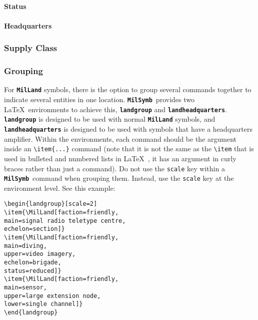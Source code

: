 \documentclass[a4paper, titlepage]{article}
\newcommand\MilSymb{\textbf{\texttt{MilSymb}}}
\newenvironment{writett}{\ttfamily}{\par}
\begin{document}
\paragraph{Status}

\paragraph{Headquarters}

\subsubsection{Supply Class}

\subsubsection{Grouping}

For \textbf{\texttt{MilLand}} symbols, there is the option to group several commands together to indicate several entities in one location. \MilSymb\  provides two \LaTeX\ environments to achieve this,  \textbf{\texttt{landgroup}} and \textbf{\texttt{landheadquarters}}.  \textbf{\texttt{landgroup}} is designed to be used with normal \textbf{\texttt{MilLand}} symbols, and \textbf{\texttt{landheadquarters}} is designed to be used with symbols that have a headquarters amplifier. Within the environments, each command should be the argument inside an \texttt{\textbackslash item\{...\}} command (note that it is not the same as the \texttt{\textbackslash item} that is used in bulleted and numbered lists in \LaTeX\ , it has an argument in curly braces rather than just a command). Do not use the \texttt{scale} key within a \MilSymb\ command when grouping them. Instead, use the \texttt{scale} key at the environment level. See this example:\\

\begin{writett}
\begin{verbatim}
\begin{landgroup}[scale=2]
\item{\MilLand[faction=friendly, 
main=signal radio teletype centre, 
echelon=section]}
\item{\MilLand[faction=friendly, 
main=diving, 
upper=video imagery, 
echelon=brigade, 
status=reduced]}
\item{\MilLand[faction=friendly, 
main=sensor, 
upper=large extension node, 
lower=single channel]}
\end{landgroup}
\end{verbatim}
\end{writett}
\end{document}

